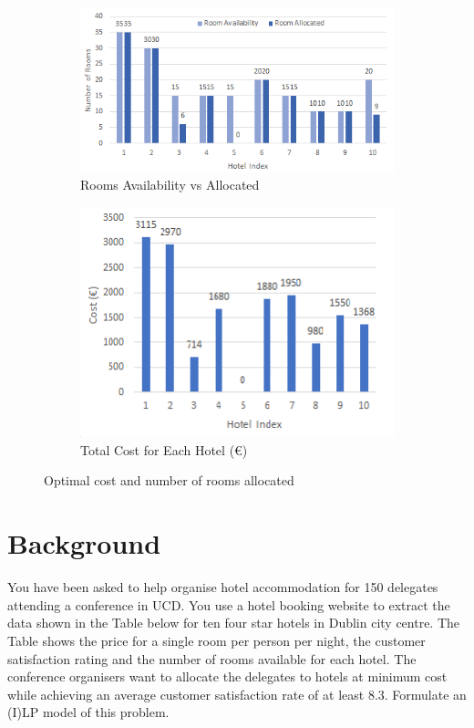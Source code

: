 \documentclass[paper=a4, fontsize=11pt]{scrartcl} %
\begin{document}
\begin{figure}[ht]
\centering
\begin{subfigure}{.5\textwidth}
  \centering
  \includegraphics[scale=0.65]{es1.png}
  \caption{Rooms Availability vs Allocated }
  \label{fig:sub1}
\end{subfigure}%
\begin{subfigure}{.5\textwidth}
  \centering
  \includegraphics[scale=0.65]{es2.png}
  \caption{Total Cost for Each Hotel (\euro)}
  \label{fig:sub2}
\end{subfigure}
\caption{ Optimal cost and number of rooms allocated } 
\label{fig:es}
\end{figure}
\clearpage	
\section{Background}
You have been asked to help organise hotel accommodation for 150 delegates
attending a conference in UCD. You use a hotel booking website to extract the data
shown in the Table below for ten four star hotels in Dublin city centre. The Table
shows the price for a single room per person per night, the customer satisfaction
rating and the number of rooms available for each hotel. The conference organisers
want to allocate the delegates to hotels at minimum cost while achieving an average
customer satisfaction rate of at least 8.3. Formulate an (I)LP model of this problem. 
\end{document}
